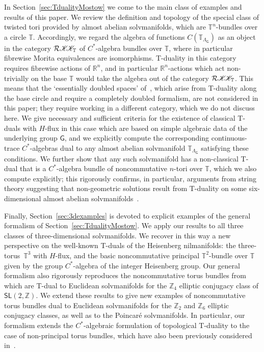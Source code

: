\documentclass[pdftex]{sigma}
\numberwithin{equation}{section}
\newcommand{\Z}{\zed}
\newcommand{\CCK}{\mathscr{K}}
\newcommand{\sfG}{\mathsf{G}}
\newcommand{\sfSL}{\mathsf{SL}}
\newcommand{\R}{\real}
\newcommand{\zed}{{\mathbb Z}} %
\newcommand{\real}{{\mathbb R}} %
\newcommand{\torus}{{\mathbb T}} %
\begin{document}
In Section~\ref{sec:TdualityMostow} we come to the main class of
examples and results of this paper. We review the definition and
topology of the special class of twisted tori provided by almost
abelian solvmanifolds, which are $\torus^n$-bundles over a circle
$\torus$. Accordingly, we regard the algebra of functions
$C(\torus_{\Lambda_\sfG})$ as an object in the category
$\mathcal{R}\CCK\hspace{-1mm}\CCK_\torus$ of $C^*$-algebra bundles
over $\torus$, where in particular fibrewise Morita equivalences are
isomorphisms. T-duality in this category requires fibrewise actions of
$\R^n$, and in particular $\R^n$-actions which act non-trivially on
the base $\torus$ would take the algebra out of the category
$\mathcal{R}\CCK\hspace{-1mm}\CCK_\torus$. This means that the `essentially
doubled spaces' of~\cite{Hull2019}, which arise from T-duality along
the base circle and require a completely doubled formalism, are not
considered in this paper; they require working in a different
category, which we do not discuss here. We give necessary and
sufficient criteria for the existence of classical T-duals with
$H$-flux in this case which are based on simple algebraic data of the
underlying group $\sfG$, and we explicitly compute the corresponding
continuous-trace $C^*$-algebras dual to any almost abelian
solvmanifold $\torus_{\Lambda_\sfG}$ satisfying these conditions. We
 further show that any such solvmanifold has a non-classical T-dual
 that is a $C^*$-algebra bundle of noncommutative $n$-tori over
 $\torus$, which we also compute explicitly; this rigorously
 confirms, in particular, arguments from string theory suggesting that non-geometric
 solutions result from T-duality on some six-dimensional almost
 abelian solvmanifolds~\cite{Andriot:2015sia}.

Finally, Section~\ref{sec:3dexamples} is devoted to explicit examples
of the general formalism of Section~\ref{sec:TdualityMostow}. We apply
our results to all three classes of three-dimensional
solvmanifolds. We recover in this way a new perspective on the
well-known T-duals of the Heisenberg nilmanifolds: the three-torus~$\torus^3$ with $H$-flux, and the basic noncommutative principal
$\torus^2$-bundle over $\torus$ given by the group $C^*$-algebra of the integer
Heisenberg group. Our general formalism also rigorously reproduces
the noncommutative torus bundles from~\cite{Hull2019} which are T-dual
to Euclidean solvmanifolds for the $\Z_4$ elliptic conjugacy class of
$\sfSL(2,\Z)$. We extend these results to give new examples of
noncommutative torus bundles dual to Euclidean solvmanifolds for the
$\Z_2$ and $\Z_6$ elliptic conjugacy classes, as well as to the
Poincar\'e solvmanifolds. In particular, our formalism extends the
$C^*$-algebraic formulation of topological T-duality to the case of
non-principal torus bundles, which have also been previously
considered in~\cite{Hannabuss2011}.
\end{document}
